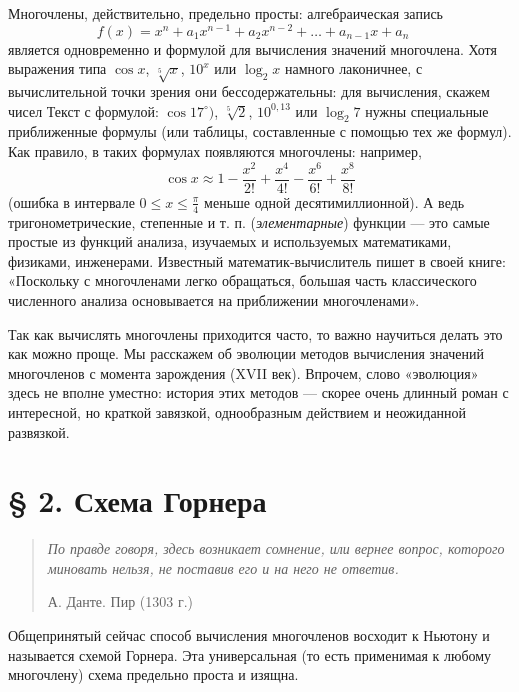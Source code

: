 Многочлены, действительно, предельно просты: алгебраическая запись
\begin{equation}
   f (x) = x^n + a_1x^{n-1} + a_2x^{n-2} + \ldots + a_{n-1}x + a_n \quad
\end{equation}
является одновременно и формулой для вычисления значений многочлена. Хотя выражения типа $\cos x$, $\sqrt[5]{x}$, $10^x$ или $\log_2 x$ намного лаконичнее, с вычислительной точки зрения они бессодержательны: для вычисления, скажем чисел Текст с формулой: $\cos17^\circ)$, $\sqrt[5]{2}$, $10^{0,13}$ или $\log_2 7$ нужны специальные приближенные формулы (или таблицы, составленные с помощью тех же формул). Как правило, в таких формулах появляются многочлены: например,
\[
\cos x \approx 1 - \frac{x^2}{2!} + \frac{x^4}{4!} - \frac{x^6}{6!} + \frac{x^8}{8!}
\]
(ошибка в интервале \( 0 \leq x \leq \frac{\pi}{4} \) меньше одной десятимиллионной).
\newpage
А ведь тригонометрические, степенные и т. п. (\textit{элементарные}) функции --- это самые простые из функций анализа, изучаемых и используемых математиками, физиками, инженерами. Известный математик-вычислитель пишет в своей книге: «Поскольку с многочленами легко обращаться, большая часть классического численного анализа основывается на приближении многочленами».

Так как вычислять многочлены приходится часто, то важно научиться делать это как можно проще. Мы расскажем об эволюции методов вычисления значений многочленов с момента зарождения (XVII век). Впрочем, слово «эволюция» здесь не вполне уместно: история этих методов --- скорее очень длинный роман с интересной, но краткой завязкой, однообразным действием и неожиданной развязкой.

\section*{§ 2. Схема Горнера}
\begin{quote}
\small\textit{По правде говоря, здесь возникает сомнение, или вернее вопрос, которого миновать нельзя, не поставив его и на него не ответив.}

\hfill{А. Данте. Пир (1303 г.)}
\end{quote}

\noindent Общепринятый сейчас способ вычисления многочленов восходит к Ньютону и называется схемой Горнера. Эта универсальная (то есть применимая к любому многочлену) схема предельно проста и изящна.

